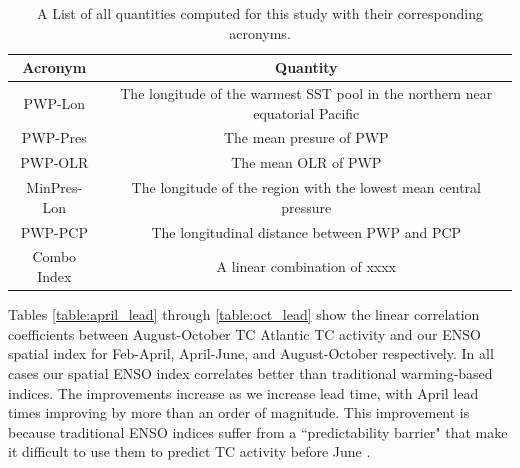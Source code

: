 \documentclass[]{article}
\begin{document}
\begin{table}
\begin{tabular}{cc}
\hline
Acronym & Quantity\\
\hline
PWP-Lon & The longitude of the warmest SST pool in the northern near equatorial Pacific\\
PWP-Pres & The mean presure of PWP\\
PWP-OLR &  The mean OLR of PWP \\
MinPres-Lon & The longitude of the region with the lowest mean central pressure\\
PWP-PCP & The longitudinal distance between PWP and PCP \\
Combo Index & A linear combination of xxxx \\
\hline
\end{tabular}
\caption{A List of all quantities computed for this study with their corresponding acronyms.}
\label{ref:acronyms}
\end{table}


Tables \ref{table:april_lead} through \ref{table:oct_lead} show the linear correlation coefficients between August-October TC Atlantic TC activity and our ENSO spatial index for Feb-April, April-June, and August-October respectively. In all cases our spatial ENSO index correlates better than traditional warming-based indices. The improvements increase as we increase lead time, with April lead times improving by more than an order of magnitude. This improvement is because traditional ENSO indices suffer from a ``predictability barrier" that make it difficult to use them to predict TC activity before June \cite{webster1992}.
\end{document}
